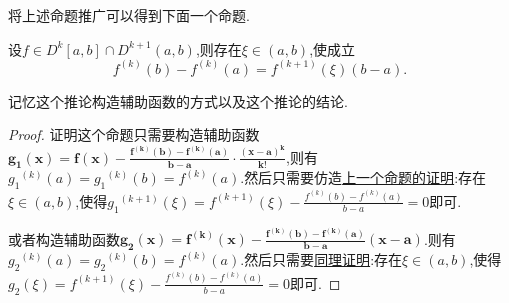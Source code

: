 \documentclass[lang=cn,newtx,10pt,scheme=chinese]{elegantbook}
\begin{document}
\begin{remark}
    将上述命题推广可以得到下面一个命题.
\end{remark}
\begin{corollary}\label{cor:Lagrange中值定理的推广(k+1阶导数)}
    设\(f\in D^{k}[a,b]\cap D^{k+1}\left( a,b \right) \),则存在\(\xi\in(a,b)\),使成立
    \[
    f^{(k)}(b) - f^{(k)}(a) = f^{(k+1)}(\xi)(b - a).
    \]
\end{corollary}
\begin{note}
    记忆这个推论构造辅助函数的方式以及这个推论的结论.
\end{note}
\begin{proof}
    证明这个命题只需要构造辅助函数$\boldsymbol{g}_{\boldsymbol{1}}\left( \boldsymbol{x} \right) =\boldsymbol{f}\left( \boldsymbol{x} \right) -\frac{\boldsymbol{f}^{\left( \boldsymbol{k} \right)}\left( \boldsymbol{b} \right) -\boldsymbol{f}^{\left( \boldsymbol{k} \right)}\left( \boldsymbol{a} \right)}{\boldsymbol{b}-\boldsymbol{a}}\cdot \frac{\left( \boldsymbol{x}-\boldsymbol{a} \right) ^{\boldsymbol{k}}}{\boldsymbol{k}!}$,则有${g_1}^{\left( k \right)}\left( a \right) ={g_1}^{\left( k \right)}\left( b \right) =f^{\left( k \right)}\left( a \right) .$然后只需要仿造\hyperref[proof:Lagrange中值定理的推广(二阶导数)-证明]{上一个命题的证明}:存在$\xi \in (a,b)$,使得${g_1}^{\left( k+1 \right)}\left( \xi \right) =f^{\left( k+1 \right)}\left( \xi \right) -\frac{f^{\left( k \right)}\left( b \right) -f^{\left( k \right)}\left( a \right)}{b-a}=0$即可.

或者构造辅助函数$\boldsymbol{g}_{\boldsymbol{2}}\left( \boldsymbol{x} \right) =\boldsymbol{f}^{\left( \boldsymbol{k} \right)}\left( \boldsymbol{x} \right) -\frac{\boldsymbol{f}^{\left( \boldsymbol{k} \right)}\left( \boldsymbol{b} \right) -\boldsymbol{f}^{\left( \boldsymbol{k} \right)}\left( \boldsymbol{a} \right)}{\boldsymbol{b}-\boldsymbol{a}}\left( \boldsymbol{x}-\boldsymbol{a} \right)$.则有${g_2}^{\left( k \right)}\left( a \right) ={g_2}^{\left( k \right)}\left( b \right) =f^{\left( k \right)}\left( a \right) .$然后只需要\hyperref[proof:Lagrange中值定理的推广(二阶导数)-证明]{同理证明}:存在$\xi \in (a,b)$,使得$g_2\left( \xi \right) =f^{\left( k+1 \right)}\left( \xi \right) -\frac{f^{\left( k \right)}\left( b \right) -f^{\left( k \right)}\left( a \right)}{b-a}=0$即可.
\end{proof}
\end{document}
